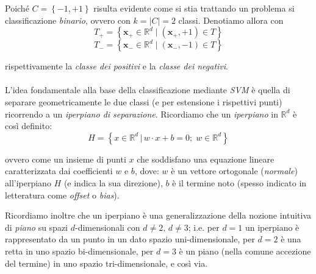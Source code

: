 Poiché $C = \left\{ -1, +1 \right\}$ risulta evidente come si stia trattando un problema si classificazione \textit{binario}, ovvero con $k = |C| = 2$ classi. Denotiamo allora con
\begin{equation}
	T_+ = \left\{ \boldsymbol{x}_+ \in \mathbb{R}^d \;|\; (\boldsymbol{x}_+, +1) \in T \right\}	
\end{equation}
\begin{equation}
	T_- = \left\{ \boldsymbol{x}_- \in \mathbb{R}^d \;|\; (\boldsymbol{x}_-, -1) \in T \right\}		
\end{equation}

rispettivamente la \textit{classe dei positivi} e la \textit{classe dei negativi}.

\paragraph{}
L'idea fondamentale alla base della classificazione mediante \textit{SVM} è quella di separare geometricamente le due classi (e per estensione i rispettivi punti) ricorrendo a un \textit{iperpiano di separazione}.
Ricordiamo che un \textit{iperpiano} in $\mathbb{R}^d$ è così definito:
\begin{equation}
	H = \left\{ x \in \mathbb{R}^d \,|\, w \cdot x + b = 0;\; w \in \mathbb{R}^d \right\}
\end{equation}

ovvero come un insieme di punti $x$ che soddisfano una equazione lineare caratterizzata dai coefficienti $w$ e $b$, dove: $w$ è un vettore ortogonale (\textit{normale}) all'iperpiano $H$ (e indica la sua direzione), $b$ è il termine noto (spesso indicato in letteratura come \textit{offset} o \textit{bias}).

Ricordiamo inoltre che un iperpiano è una generalizzazione della nozione intuitiva di \textit{piano} su spazi $d$-dimensionali con $d \neq 2,\, d \neq 3$; i.e. per $d = 1$ un iperpiano è rappresentato da un punto in un dato spazio uni-dimensionale, per $d = 2$ è una retta in uno spazio bi-dimensionale, per $d = 3$ è un piano (nella comune accezione del termine) in uno spazio tri-dimensionale, e così via.

